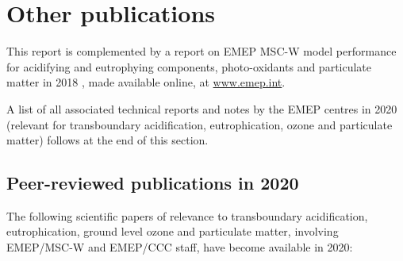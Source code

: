 \section{Other publications}
\label{sec:publ}
This report is complemented by a report on EMEP MSC-W model performance for acidifying and eutrophying components, photo-oxidants and particulate matter in 2018 \citep{WEB2020:Eval}, made available online, at \url{www.emep.int}.



A list of all associated technical reports and notes  by the EMEP
centres in 2020 (relevant for transboundary acidification, eutrophication,
ozone and particulate matter) follows at the end of this section.

\subsection*{Peer-reviewed publications in 2020}

The following scientific papers of relevance to transboundary acidification, eutrophication, ground level ozone and particulate matter, involving EMEP/MSC-W and EMEP/CCC staff, have become available in 2020:

